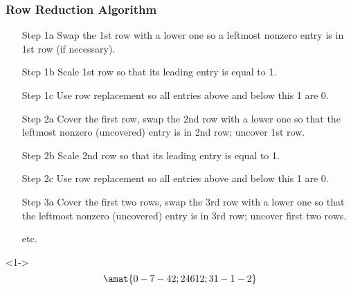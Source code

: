 \begin{frame}
\frametitle{Row Reduction Algorithm}

\begin{itemize}[<+->]
\item [Step 1a] Swap the 1st row with a lower one so a leftmost nonzero entry is
  in 1st row (if necessary).
\item [Step 1b] Scale 1st row so that its leading entry is equal to 1.
\item [Step 1c] Use row replacement so all entries above and below this 1 are 0.
\item [Step 2a] Cover the first row, swap the 2nd row with a lower one so that the leftmost nonzero (uncovered) entry is in 2nd row; uncover 1st row.
\item [Step 2b] Scale 2nd row so that its leading entry is equal to 1.
\item [Step 2c] Use row replacement so all entries above and below this 1 are 0.
\item [Step 3a] Cover the first two rows, swap the 3rd row with a lower one so
  that the leftmost nonzero (uncovered) entry is in 3rd row; uncover first two rows.
\item [etc.]
\end{itemize}


\begin{eg}<1->\vskip-5mm
  \[\amat{
    0   -7   -4   2 ;
    2   4   6   12 ;
    3   1   -1   -2
  }\]
\end{eg}

\end{frame}



